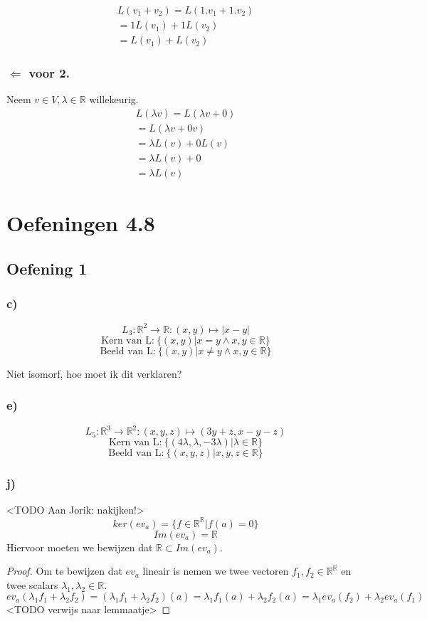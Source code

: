 \documentclass[lineaire_algebra_oplossingen.tex]{subfiles}
\begin{document}
\begin{align*}
L(v_1 + v_2) = L(1.v_1+1.v_2) \tag{co\"effici\"ent 1 in V}\\
=1L(v_1)+1L(v_2) \tag{wegens 3.}\\
=L(v_1)+L(v_2) \tag{co\"effici\"ent 1 in W}
\end{align*}

\subsubsection*{$\Leftarrow$ voor 2.}
Neem $v\in V, \lambda \in \mathbb{R}$ willekeurig.
\begin{align*}
L(\lambda v)=L(\lambda v + 0) \tag{neutraal element in V}\\
=L(\lambda v + 0v)\tag{Lemma 3.8}\\
=\lambda L(v) + 0 L(v) \tag{wegens 3.}\\
=\lambda L(v) + 0 \tag{Lemma 3.8 in W}\\
=\lambda L(v) \tag{neutraal element in W}
\end{align*}
\section{Oefeningen 4.8}
\subsection{Oefening 1}
\subsubsection{c)}
$$
L_3:\mathbb{R}^2\rightarrow\mathbb{R}:(x,y)\mapsto |x-y|
$$
$$
\text{Kern van L:} \ \{(x,y)|x=y \wedge x,y \in \mathbb{R} \}
$$
$$
\text{Beeld van L:} \ \{(x,y)|x\neq y \wedge x,y \in \mathbb{R} \}
$$
\begin{center}
Niet isomorf, hoe moet ik dit verklaren?
\end{center}
\subsubsection{e)}
$$
L_5:\mathbb{R}^3\rightarrow\mathbb{R}^2:(x,y,z)\mapsto (3y+z,x-y-z)
$$
$$
\text{Kern van L:} \ \{(4\lambda ,\lambda ,-3\lambda)|\lambda \in \mathbb{R} \}
$$
$$
\text{Beeld van L:} \ \{(x ,y ,z)|x,y,z \in \mathbb{R} \}
$$

\subsubsection*{j)}
<TODO Aan Jorik: nakijken!>
\[
ker(ev_a) = \{ f \in \mathbb{R}^{\mathbb{R}} | f(a) = 0\}
\]
\[
Im(ev_a) = \mathbb{R}
\]
Hiervoor moeten we bewijzen dat $\mathbb{R} \subset Im(ev_a)$.
\begin{proof}
Om te bewijzen dat $ev_a$ lineair is nemen we twee vectoren $f_1,f_2 \in \mathbb{R}^{\mathbb{R}}$ en twee scalars $\lambda_1, \lambda_2 \in \mathbb{R}$.
\[
ev_a(\lambda_1f_1 + \lambda_2f_2) = (\lambda_1f_1 + \lambda_2f_2)(a) = \lambda_1f_1(a) + \lambda_2f_2(a) = \lambda_1ev_a(f_2) + \lambda_2ev_a(f_1)
\]
<TODO verwijs naar lemmaatje>
\end{proof}
\end{document}
